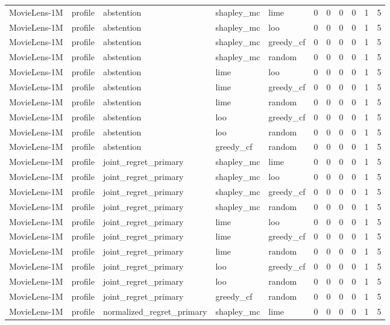 \begin{table}[t]
{\begin{tabular}{lllllrrrrrr}
MovieLens-1M & profile & abstention & shapley\_mc & lime & 0 & 0 & 0 & 0 & 1 & 5 \\
MovieLens-1M & profile & abstention & shapley\_mc & loo & 0 & 0 & 0 & 0 & 1 & 5 \\
MovieLens-1M & profile & abstention & shapley\_mc & greedy\_cf & 0 & 0 & 0 & 0 & 1 & 5 \\
MovieLens-1M & profile & abstention & shapley\_mc & random & 0 & 0 & 0 & 0 & 1 & 5 \\
MovieLens-1M & profile & abstention & lime & loo & 0 & 0 & 0 & 0 & 1 & 5 \\
MovieLens-1M & profile & abstention & lime & greedy\_cf & 0 & 0 & 0 & 0 & 1 & 5 \\
MovieLens-1M & profile & abstention & lime & random & 0 & 0 & 0 & 0 & 1 & 5 \\
MovieLens-1M & profile & abstention & loo & greedy\_cf & 0 & 0 & 0 & 0 & 1 & 5 \\
MovieLens-1M & profile & abstention & loo & random & 0 & 0 & 0 & 0 & 1 & 5 \\
MovieLens-1M & profile & abstention & greedy\_cf & random & 0 & 0 & 0 & 0 & 1 & 5 \\
MovieLens-1M & profile & joint\_regret\_primary & shapley\_mc & lime & 0 & 0 & 0 & 0 & 1 & 5 \\
MovieLens-1M & profile & joint\_regret\_primary & shapley\_mc & loo & 0 & 0 & 0 & 0 & 1 & 5 \\
MovieLens-1M & profile & joint\_regret\_primary & shapley\_mc & greedy\_cf & 0 & 0 & 0 & 0 & 1 & 5 \\
MovieLens-1M & profile & joint\_regret\_primary & shapley\_mc & random & 0 & 0 & 0 & 0 & 1 & 5 \\
MovieLens-1M & profile & joint\_regret\_primary & lime & loo & 0 & 0 & 0 & 0 & 1 & 5 \\
MovieLens-1M & profile & joint\_regret\_primary & lime & greedy\_cf & 0 & 0 & 0 & 0 & 1 & 5 \\
MovieLens-1M & profile & joint\_regret\_primary & lime & random & 0 & 0 & 0 & 0 & 1 & 5 \\
MovieLens-1M & profile & joint\_regret\_primary & loo & greedy\_cf & 0 & 0 & 0 & 0 & 1 & 5 \\
MovieLens-1M & profile & joint\_regret\_primary & loo & random & 0 & 0 & 0 & 0 & 1 & 5 \\
MovieLens-1M & profile & joint\_regret\_primary & greedy\_cf & random & 0 & 0 & 0 & 0 & 1 & 5 \\
MovieLens-1M & profile & normalized\_regret\_primary & shapley\_mc & lime & 0 & 0 & 0 & 0 & 1 & 5 \\

\end{tabular}}
\end{table}
